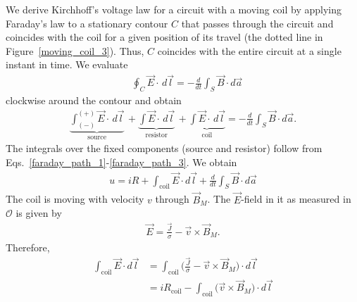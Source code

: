 \documentclass[11pt,a4paper,oneside]{book}
\numberwithin{equation}{section}
\theoremstyle{it}
\theoremstyle{definition}
\begin{document}
We derive Kirchhoff's voltage law for a circuit with a moving coil by applying Faraday's law to a stationary contour $C$ that passes through the circuit and coincides with the coil for a given position of its travel (the dotted line in Figure~\ref{moving_coil_3}). Thus, $C$ coincides with the entire circuit at a single instant in time. We evaluate
 \begin{equation}\label{faraday_mc_1}
	\begin{aligned}
		&\oint_C \vec{E}\cdot\,d\vec{l}=-\frac{d}{d t}\int_S\vec{B}\cdot d\vec{a}
	\end{aligned}
\end{equation} 
clockwise around the contour and obtain 
\begin{equation}\label{faraday_path_4}
	\begin{aligned}
		\underbrace{\int_{(-)}^{(+)}\vec{E}\cdot\,d\vec{l}}_{\text{source}} \, + \underbrace{\int\vec{E}\cdot\,d\vec{l}}_{\text{resistor}} \, + 
		\underbrace{\int\vec{E}\cdot\,d\vec{l}}_{\text{coil}} = - \frac{d}{dt}\int_S\vec{B}\cdot d\vec{a} .
	\end{aligned}
\end{equation} 
The integrals over the fixed components (source and resistor) follow from Eqs.~\eqref{faraday_path_1}-\ref{faraday_path_3}. We obtain
 \begin{equation}\label{faraday_path_5}
	\begin{aligned}
		u = iR+\int_{\text{coil}}\vec{E}\cdot d\vec{l} + \frac{d}{dt}\int_S\vec{B}\cdot d\vec{a}
	\end{aligned}
\end{equation} 
The coil is moving with velocity $v$ through $\vec{B}_M$. The $\vec{E}$-field in it as measured in $\mathcal{O}$ is given by
\begin{equation}\label{faraday_path_6}
	\begin{aligned}
		\vec{E}=\frac{\vec{J}}{\sigma} - \vec{v}\times\vec{B}_M.
	\end{aligned}
\end{equation} 
Therefore,
\begin{equation}\label{faraday_path_7}
	\begin{aligned}
		\int_{\text{coil}}\vec{E}\cdot d\vec{l}&=\int_{\text{coil}}\Big(\frac{\vec{J}}{\sigma}-\vec{v}\times\vec{B}_M\Big)\cdot d\vec{l} \\[8pt]
		&=iR_{\text{coil}} - \int_{\text{coil}}\big(\vec{v}\times\vec{B}_M\big)\cdot d\vec{l}
	\end{aligned}
\end{equation} 
\end{document}

